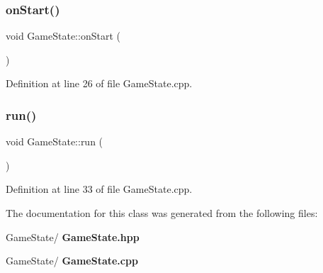 \subsubsection{on\+Start()}
{\footnotesize\ttfamily void Game\+State\+::on\+Start (\begin{DoxyParamCaption}{ }\end{DoxyParamCaption})}



Definition at line 26 of file Game\+State.\+cpp.

\mbox{\label{class_game_state_a900313eb102c9466e80903a654b7ee3e}} 
\subsubsection{run()}
{\footnotesize\ttfamily void Game\+State\+::run (\begin{DoxyParamCaption}{ }\end{DoxyParamCaption})}



Definition at line 33 of file Game\+State.\+cpp.



The documentation for this class was generated from the following files\+:\begin{DoxyCompactItemize}
\item 
Game\+State/\textbf{ Game\+State.\+hpp}\item 
Game\+State/\textbf{ Game\+State.\+cpp}\end{DoxyCompactItemize}
